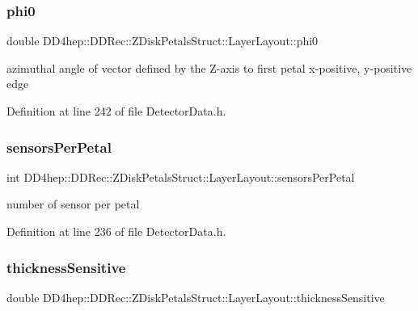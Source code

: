 \subsubsection{\texorpdfstring{phi0}{phi0}}
{\footnotesize\ttfamily double D\+D4hep\+::\+D\+D\+Rec\+::\+Z\+Disk\+Petals\+Struct\+::\+Layer\+Layout\+::phi0}



azimuthal angle of vector defined by the Z-\/axis to first petal x-\/positive, y-\/positive edge 



Definition at line 242 of file Detector\+Data.\+h.

\hypertarget{struct_d_d4hep_1_1_d_d_rec_1_1_z_disk_petals_struct_1_1_layer_layout_af4b922495a14cb54c5d6412ef1097d52}{}\label{struct_d_d4hep_1_1_d_d_rec_1_1_z_disk_petals_struct_1_1_layer_layout_af4b922495a14cb54c5d6412ef1097d52} 
\subsubsection{\texorpdfstring{sensors\+Per\+Petal}{sensorsPerPetal}}
{\footnotesize\ttfamily int D\+D4hep\+::\+D\+D\+Rec\+::\+Z\+Disk\+Petals\+Struct\+::\+Layer\+Layout\+::sensors\+Per\+Petal}



number of sensor per petal 



Definition at line 236 of file Detector\+Data.\+h.

\hypertarget{struct_d_d4hep_1_1_d_d_rec_1_1_z_disk_petals_struct_1_1_layer_layout_a49622208adfa9ec0dc736f92cfc82a46}{}\label{struct_d_d4hep_1_1_d_d_rec_1_1_z_disk_petals_struct_1_1_layer_layout_a49622208adfa9ec0dc736f92cfc82a46} 
\subsubsection{\texorpdfstring{thickness\+Sensitive}{thicknessSensitive}}
{\footnotesize\ttfamily double D\+D4hep\+::\+D\+D\+Rec\+::\+Z\+Disk\+Petals\+Struct\+::\+Layer\+Layout\+::thickness\+Sensitive}



